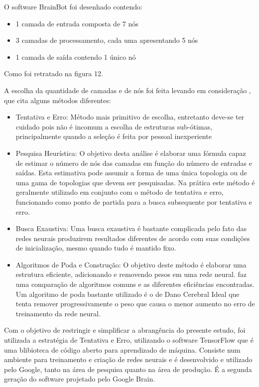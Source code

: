 O software BrainBot foi desenhado contendo:

\begin{itemize}
  \item 1 camada de entrada composta de 7 nós
  \item 3 camadas de processamento, cada uma apresentando 5 nós
  \item 1 camada de saída contendo 1 único nó
\end{itemize}

Como foi retratado na figura 12.

A escolha da quantidade de camadas e de nós foi feita levando em consideração \cite{tay}, que cita alguns métodos diferentes:

\begin{itemize}
  \item Tentativa e Erro: Método mais primitivo de escolha, entretanto deve-se ter cuidado pois não é incomum a escolha de estruturas sub-ótimas, principalmente quando a seleção é feita por pessoal inexperiente
	\item Pesquisa Heurística: O objetivo desta análise é elaborar uma fórmula capaz de estimar o número de nós das camadas em função
	do número de entradas e saídas. Esta estimativa pode assumir a forma de uma única topologia ou de uma gama de topologias que devem ser pesquisadas.
	Na prática este método é geralmente utilizado em conjunto com o método de tentativa e erro, funcionando como ponto de partida para a busca subsequente por tentativa e erro.
	\item Busca Exaustiva: Uma busca exaustiva é bastante complicada pelo fato das redes neurais produzirem resultados diferentes de acordo com suas condições
	de inicialização, mesmo quando tudo é mantido fixo.
	\item Algoritmos de Poda e Construção: O objetivo deste método é elaborar uma estrutura eficiente, adicionando e removendo pesos em uma rede neural. \cite{hassibi} faz uma comparação de algoritmos comuns e as diferentes eficiências encontradas.
	Um algoritmo de poda bastante utilizado é o de Dano Cerebral Ideal \cite{yann} que tenta remover progressivamente o peso que causa o menor aumento no erro de treinamento da rede neural.
\end{itemize}

Com o objetivo de restringir e simplificar a abrangência do presente estudo, foi utilizada a estratégia de Tentativa e Erro, utilizando o software TensorFlow que é uma blibioteca de código aberto
para aprendizado de máquina. Consiste num ambiente para treinamento e criação de redes neurais e é desenvolvido e utilizado pelo Google, tanto na área de pesquisa quanto na área de produção. É a segunda
geração do software projetado pelo Google Brain. \cite{tensor}

